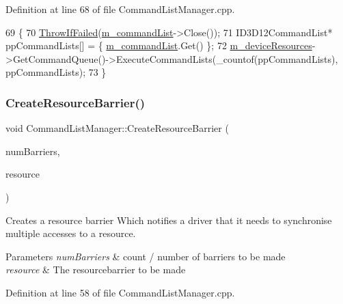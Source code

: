 Definition at line 68 of file Command\+List\+Manager.\+cpp.


\begin{DoxyCode}
69 \{
70     \mbox{\hyperlink{_direct_x_helper_8h_abca3eeca6b5772a1112e0a9a9e3d9013}{ThrowIfFailed}}(\mbox{\hyperlink{class_command_list_manager_a1366f0acddca408167ffcab59be71ddb}{m\_commandList}}->Close());
71     ID3D12CommandList* ppCommandLists[] = \{ \mbox{\hyperlink{class_command_list_manager_a1366f0acddca408167ffcab59be71ddb}{m\_commandList}}.Get() \};
72     \mbox{\hyperlink{class_command_list_manager_a1c48b5dc7b34886ce5057ac194a2385e}{m\_deviceResources}}->GetCommandQueue()->ExecuteCommandLists(\_countof(ppCommandLists), 
      ppCommandLists);
73 \}
\end{DoxyCode}
\mbox{\label{class_command_list_manager_a2d7afa441d20a24e50a1891c46cfdd60}} 
\subsubsection{\texorpdfstring{Create\+Resource\+Barrier()}{CreateResourceBarrier()}\hspace{0.1cm}{\footnotesize\ttfamily [1/2]}}
{\footnotesize\ttfamily void Command\+List\+Manager\+::\+Create\+Resource\+Barrier (\begin{DoxyParamCaption}\item[{int}]{num\+Barriers,  }\item[{C\+D3\+D\+X12\+\_\+\+R\+E\+S\+O\+U\+R\+C\+E\+\_\+\+B\+A\+R\+R\+I\+ER $\ast$}]{resource }\end{DoxyParamCaption})}



Creates a resource barrier Which notifies a driver that it needs to synchronise multiple accesses to a resource. 


\begin{DoxyParams}{Parameters}
{\em num\+Barriers} & count / number of barriers to be made \\
\hline
{\em resource} & The resourcebarrier to be made \\
\hline
\end{DoxyParams}


Definition at line 58 of file Command\+List\+Manager.\+cpp.


